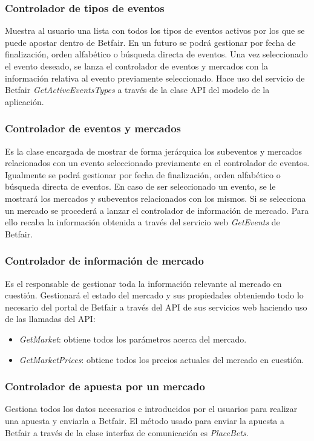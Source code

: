 \subsubsection{Controlador de tipos de eventos}
 Muestra al usuario una lista con todos los tipos de eventos activos por los que se puede apostar dentro de Betfair. En un futuro se podrá gestionar por fecha de finalización, orden alfabético o búsqueda directa de eventos. Una vez seleccionado el evento deseado, se lanza el controlador de eventos y mercados con la información relativa al evento previamente seleccionado. Hace uso del servicio de Betfair \emph{GetActiveEventsTypes}  a través de la clase API del modelo de la aplicación.
 
\subsubsection{Controlador de eventos y mercados}

 Es la clase encargada de mostrar de forma jerárquica los subeventos y mercados relacionados con un evento seleccionado previamente en el controlador de eventos. Igualmente se podrá gestionar por fecha de finalización, orden alfabético o búsqueda directa de eventos. En caso de ser seleccionado un evento, se le mostrará los mercados y subeventos relacionados con los mismos. Si se selecciona un mercado se procederá a lanzar el controlador de información de mercado. Para ello recaba la información obtenida a través del servicio web \emph{GetEvents} de Betfair.
 
\subsubsection{Controlador de información de mercado}

 Es el responsable de gestionar toda la información relevante al mercado en cuestión. Gestionará el estado del mercado y sus propiedades obteniendo todo lo necesario del portal de Betfair a través del API de sus servicios web haciendo uso de las llamadas del API:
 
  \begin{itemize}
	\item \emph{GetMarket}: obtiene todos los parámetros acerca del mercado.
	\item \emph{GetMarketPrices}: obtiene todos los precios actuales del mercado en cuestión.
\end{itemize}

\subsubsection{Controlador de apuesta por un mercado}
 Gestiona todos los datos necesarios e introducidos por el usuarios para realizar una apuesta y enviarla a Betfair. El método usado para enviar la apuesta a Betfair a través de la clase interfaz de comunicación es \emph{PlaceBets}.


